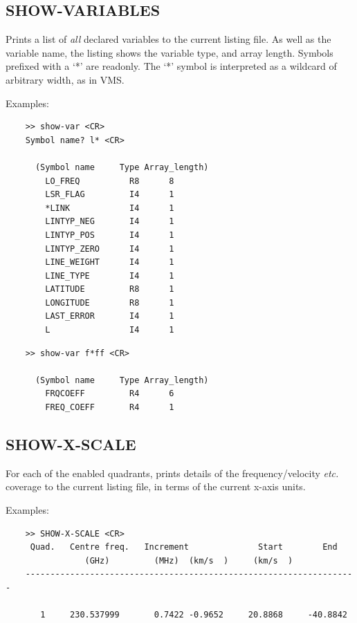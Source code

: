 \documentclass[11pt,twoside]{report}
\newcommand{\etc}{{\it etc.\,}}
\begin{document}
\subsection{SHOW-VARIABLES} 

Prints a list of {\em all} declared variables to the current listing file.
As well as the variable name, the listing shows the variable type, and array
length. Symbols prefixed with a `*' are readonly.
The `*' symbol is interpreted as a wildcard of arbitrary width, as in VMS.

Examples:
\begin{verbatim}
    >> show-var <CR>
    Symbol name? l* <CR>

      (Symbol name     Type Array_length)
        LO_FREQ          R8      8
        LSR_FLAG         I4      1
        *LINK            I4      1
        LINTYP_NEG       I4      1
        LINTYP_POS       I4      1
        LINTYP_ZERO      I4      1
        LINE_WEIGHT      I4      1
        LINE_TYPE        I4      1
        LATITUDE         R8      1
        LONGITUDE        R8      1
        LAST_ERROR       I4      1
        L                I4      1
\end{verbatim}

\begin{verbatim}
    >> show-var f*ff <CR>

      (Symbol name     Type Array_length)
        FRQCOEFF         R4      6
        FREQ_COEFF       R4      1
\end{verbatim}

\subsection{SHOW-X-SCALE} 

For each of the enabled quadrants, prints details of the frequency/velocity
\etc coverage to the current listing file, in terms of the current x-axis
units.

Examples:
\begin{verbatim}
    >> SHOW-X-SCALE <CR>
     Quad.   Centre freq.   Increment              Start        End
                (GHz)         (MHz)  (km/s  )     (km/s  )
    -------------------------------------------------------------------

       1     230.537999       0.7422 -0.9652     20.8868     -40.8842

\end{verbatim}
\end{document}
